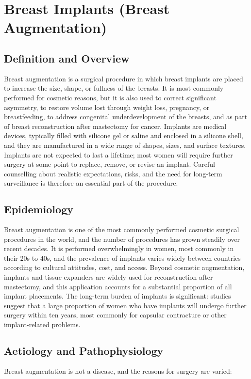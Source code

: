 \chapter{Breast Implants (Breast Augmentation)}

\section*{Definition and Overview}
Breast augmentation is a surgical procedure in which breast implants are placed to increase the size, shape, or fullness of the breasts. It is most commonly performed for cosmetic reasons, but it is also used to correct significant asymmetry, to restore volume lost through weight loss, pregnancy, or breastfeeding, to address congenital underdevelopment of the breasts, and as part of breast reconstruction after mastectomy for cancer. Implants are medical devices, typically filled with silicone gel or saline and enclosed in a silicone shell, and they are manufactured in a wide range of shapes, sizes, and surface textures. Implants are not expected to last a lifetime; most women will require further surgery at some point to replace, remove, or revise an implant. Careful counselling about realistic expectations, risks, and the need for long-term surveillance is therefore an essential part of the procedure.

\section*{Epidemiology}
Breast augmentation is one of the most commonly performed cosmetic surgical procedures in the world, and the number of procedures has grown steadily over recent decades. It is performed overwhelmingly in women, most commonly in their 20s to 40s, and the prevalence of implants varies widely between countries according to cultural attitudes, cost, and access. Beyond cosmetic augmentation, implants and tissue expanders are widely used for reconstruction after mastectomy, and this application accounts for a substantial proportion of all implant placements. The long-term burden of implants is significant: studies suggest that a large proportion of women who have implants will undergo further surgery within ten years, most commonly for capsular contracture or other implant-related problems.

\section*{Aetiology and Pathophysiology}
Breast augmentation is not a disease, and the reasons for surgery are varied:

